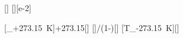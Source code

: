 [\degreeCelsius]
[\percent][e-2]

[\vartheta_+\SI{273.15}{\kelvin}]{\tkX+273.15}[\kelvin]
[]{\TkX/(1-\etSX)}[\kelvin]
[T_-\SI{273.15}{\kelvin}]{}[\degreeCelsius]
